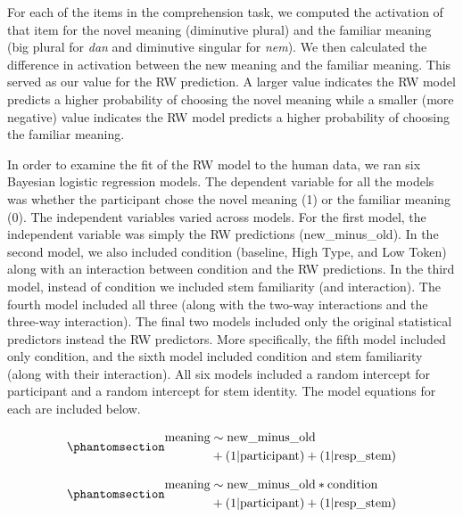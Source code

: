 \documentclass[
  letterpaper,
  DIV=11,
  numbers=noendperiod]{scrartcl}
\begin{document}
For each of the items in the comprehension task, we computed the
activation of that item for the novel meaning (diminutive plural) and
the familiar meaning (big plural for \emph{dan} and diminutive singular
for \emph{nem}). We then calculated the difference in activation between
the new meaning and the familiar meaning. This served as our value for
the RW prediction. A larger value indicates the RW model predicts a
higher probability of choosing the novel meaning while a smaller (more
negative) value indicates the RW model predicts a higher probability of
choosing the familiar meaning.

In order to examine the fit of the RW model to the human data, we ran
six Bayesian logistic regression models. The dependent variable for all
the models was whether the participant chose the novel meaning (1) or
the familiar meaning (0). The independent variables varied across
models. For the first model, the independent variable was simply the RW
predictions (new\_minus\_old). In the second model, we also included
condition (baseline, High Type, and Low Token) along with an interaction
between condition and the RW predictions. In the third model, instead of
condition we included stem familiarity (and interaction). The fourth
model included all three (along with the two-way interactions and the
three-way interaction). The final two models included only the original
statistical predictors instead the RW predictors. More specifically, the
fifth model included only condition, and the sixth model included
condition and stem familiarity (along with their interaction). All six
models included a random intercept for participant and a random
intercept for stem identity. The model equations for each are included
below.

\begin{equation}\phantomsection\label{eq-rwcomp1}{
\begin{aligned}
\text{meaning} & \sim \text{new\_minus\_old} \\ 
& +  (1 | \text{participant}) + (1|\text{resp\_stem})
\end{aligned}
}\end{equation}

\begin{equation}\phantomsection\label{eq-rwcomp2}{
\begin{aligned}
\text{meaning} & \sim \text{new\_minus\_old} * \text{condition} \\ 
& +  (1 | \text{participant}) + (1|\text{resp\_stem})
\end{aligned}
}\end{equation}
\end{document}

